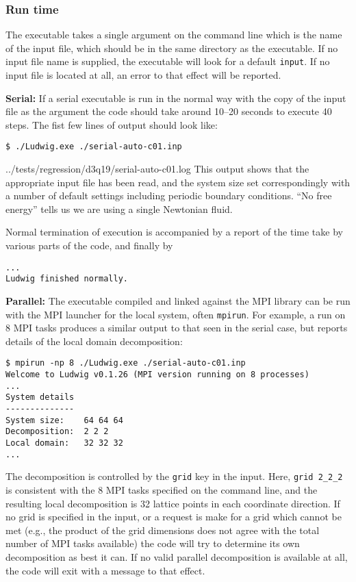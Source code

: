 \subsubsection{Run time}

The executable takes a single argument on the command line which
is the name of the input file, which should be in the same
directory as the executable. If no input file name is supplied,
the executable will look for a default \texttt{input}. If no
input file is located at all, an error to that effect will be
reported.

\textbf{Serial: }
If a serial executable is run in the normal way with the copy of the
input file as the argument the code should take around 10--20 seconds
to execute 40 steps. The fist few lines of output should look like:

\begin{lstlisting}[belowskip=0pt]
$ ./Ludwig.exe ./serial-auto-c01.inp
\end{lstlisting}

{../tests/regression/d3q19/serial-auto-c01.log}
This output shows that the appropriate input file has been read, and
the system size set correspondingly with a number of default settings
including periodic boundary conditions. ``No free energy'' tells us we
are using a single Newtonian fluid.

Normal termination of execution is accompanied by a report
of the time take by various parts of the code, and finally by
\begin{lstlisting}
...
Ludwig finished normally.
\end{lstlisting}

\textbf{Parallel: }
The executable compiled and linked against the MPI library can
be run with the MPI launcher for the local system, often
\texttt{mpirun}. For example, a run on 8 MPI tasks produces a
similar output to that seen in the serial case, but reports
details of the local domain decomposition:
\begin{lstlisting}
$ mpirun -np 8 ./Ludwig.exe ./serial-auto-c01.inp
Welcome to Ludwig v0.1.26 (MPI version running on 8 processes)
...
System details
--------------
System size:    64 64 64
Decomposition:  2 2 2
Local domain:   32 32 32
...
\end{lstlisting}
The decomposition is controlled by the \texttt{grid} key in
the input. Here, \texttt{grid 2\_2\_2} is consistent with the
8 MPI tasks specified on the command line, and the resulting
local decomposition is 32 lattice points in each coordinate direction.
If no grid is specified in the input, or a request is
make for a grid which cannot be met (e.g., the product
of the grid dimensions does not agree with the total number
of MPI tasks available)
the code will try to determine its own decomposition as best
it can. If no valid parallel decomposition is available at all,
the code will exit with a message to that effect.

